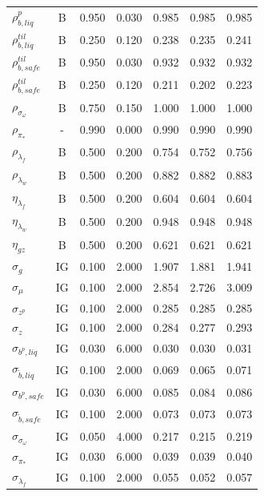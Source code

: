 \documentclass[12pt]{article}
\begin{document}
{\begin{longtable}{lcccccc}
$\rho_{b,liq}^{p}$ & B &    0.950 &    0.030 &    0.985 &    0.985 &    0.985 \\
$\rho_{b,liq}^{til}$ & B &    0.250 &    0.120 &    0.238 &    0.235 &    0.241 \\
$\rho_{b,safe}^{til}$ & B &    0.950 &    0.030 &    0.932 &    0.932 &    0.932 \\
$\rho_{b,safe}^{til}$ & B &    0.250 &    0.120 &    0.211 &    0.202 &    0.223 \\
$\rho_{\sigma_\omega}$ & B &    0.750 &    0.150 &    1.000 &    1.000 &    1.000 \\
$\rho_{\pi_*}$ & - &    0.990 &    0.000 &    0.990 &    0.990 &    0.990 \\
$\rho_{\lambda_f}$ & B &    0.500 &    0.200 &    0.754 &    0.752 &    0.756 \\
$\rho_{\lambda_w}$ & B &    0.500 &    0.200 &    0.882 &    0.882 &    0.883 \\
$\eta_{\lambda_f}$ & B &    0.500 &    0.200 &    0.604 &    0.604 &    0.604 \\
$\eta_{\lambda_w}$ & B &    0.500 &    0.200 &    0.948 &    0.948 &    0.948 \\
$\eta_{gz}$ & B &    0.500 &    0.200 &    0.621 &    0.621 &    0.621 \\
$\sigma_{g}$ & IG &    0.100 &    2.000 &    1.907 &    1.881 &    1.941 \\
$\sigma_{\mu}$ & IG &    0.100 &    2.000 &    2.854 &    2.726 &    3.009 \\
$\sigma_{z^p}$ & IG &    0.100 &    2.000 &    0.285 &    0.285 &    0.285 \\
$\sigma_{z}$ & IG &    0.100 &    2.000 &    0.284 &    0.277 &    0.293 \\
$\sigma_{b^p, liq}$ & IG &    0.030 &    6.000 &    0.030 &    0.030 &    0.031 \\
$\sigma_{\tilde{b}, liq}$ & IG &    0.100 &    2.000 &    0.069 &    0.065 &    0.071 \\
$\sigma_{b^p, safe}$ & IG &    0.030 &    6.000 &    0.085 &    0.084 &    0.086 \\
$\sigma_{\tilde{b}, safe}$ & IG &    0.100 &    2.000 &    0.073 &    0.073 &    0.073 \\
$\sigma_{\sigma_\omega}$ & IG &    0.050 &    4.000 &    0.217 &    0.215 &    0.219 \\
$\sigma_{\pi_*}$ & IG &    0.030 &    6.000 &    0.039 &    0.039 &    0.040 \\
$\sigma_{\lambda_f}$ & IG &    0.100 &    2.000 &    0.055 &    0.052 &    0.057 \\

\end{longtable}}
\end{document}
